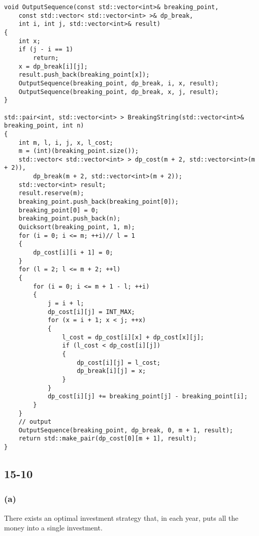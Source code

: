 \begin{verbatim}
void OutputSequence(const std::vector<int>& breaking_point, 
    const std::vector< std::vector<int> >& dp_break,
    int i, int j, std::vector<int>& result)
{
    int x;
    if (j - i == 1)
        return;
    x = dp_break[i][j];
    result.push_back(breaking_point[x]);
    OutputSequence(breaking_point, dp_break, i, x, result);
    OutputSequence(breaking_point, dp_break, x, j, result);
}

std::pair<int, std::vector<int> > BreakingString(std::vector<int>& breaking_point, int n)
{
    int m, l, i, j, x, l_cost;
    m = (int)(breaking_point.size());
    std::vector< std::vector<int> > dp_cost(m + 2, std::vector<int>(m + 2)),
        dp_break(m + 2, std::vector<int>(m + 2));
    std::vector<int> result;
    result.reserve(m);
    breaking_point.push_back(breaking_point[0]);
    breaking_point[0] = 0;
    breaking_point.push_back(n);
    Quicksort(breaking_point, 1, m);
    for (i = 0; i <= m; ++i)// l = 1
    {
        dp_cost[i][i + 1] = 0;
    }
    for (l = 2; l <= m + 2; ++l)
    {
        for (i = 0; i <= m + 1 - l; ++i)
        {
            j = i + l;
            dp_cost[i][j] = INT_MAX;
            for (x = i + 1; x < j; ++x)
            {
                l_cost = dp_cost[i][x] + dp_cost[x][j];
                if (l_cost < dp_cost[i][j])
                {
                    dp_cost[i][j] = l_cost;
                    dp_break[i][j] = x;
                }
            }
            dp_cost[i][j] += breaking_point[j] - breaking_point[i];
        }
    }
    // output
    OutputSequence(breaking_point, dp_break, 0, m + 1, result);
    return std::make_pair(dp_cost[0][m + 1], result);
}
\end{verbatim}

\subsection*{15-10}

\subsubsection*{(a)}


\begin{claim}
    There exists an optimal investment strategy that, in each year,
    puts all the money into a single investment.
\end{claim}

